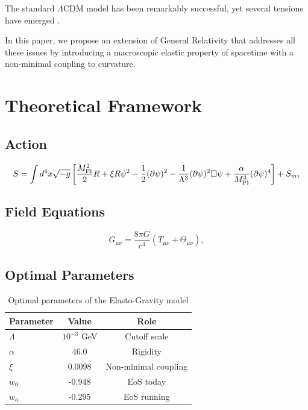 \documentclass[aps,prd,preprint,superscriptaddress]{revtex4-2}
\newcommand{\Mpl}{M_{\rm Pl}}
\newcommand{\Lamb}{\Lambda}
\newcommand{\scal}{\psi}
\newcommand{\Tmu}{\Theta_{\mu\nu}}
\begin{document}
The standard $\Lambda$CDM model has been remarkably successful, yet several tensions have emerged \cite{Planck2018, Riess2019, Hildebrandt2020, DESI2024}.

In this paper, we propose an extension of General Relativity that addresses all these issues by introducing a macroscopic elastic property of spacetime with a non-minimal coupling to curvature.

\section{Theoretical Framework}

\subsection{Action}

\begin{equation}
S = \int d^4x \sqrt{-g} \left[ \frac{\Mpl^2}{2}R + \xi R\scal^2 - \frac{1}{2}(\partial\scal)^2 - \frac{1}{\Lamb^3}(\partial\scal)^2\Box\scal + \frac{\alpha}{\Mpl^4}(\partial\scal)^4 \right] + S_m,
\label{eq:action}
\end{equation}

\subsection{Field Equations}

\begin{equation}
G_{\mu\nu} = \frac{8\pi G}{c^4}\left(T_{\mu\nu} + \Tmu\right),
\label{eq:einstein}
\end{equation}

\subsection{Optimal Parameters}

\begin{table}[h]
\centering
\caption{Optimal parameters of the Elasto-Gravity model}
\begin{tabular}{lcc}
\toprule
Parameter & Value & Role \\
\midrule
$\Lamb$ & $10^{-3}$ GeV & Cutoff scale \\
$\alpha$ & 46.0 & Rigidity \\
$\xi$ & 0.0098 & Non-minimal coupling \\
$w_0$ & -0.948 & EoS today \\
$w_a$ & -0.295 & EoS running \\
\bottomrule
\end{tabular}
\label{tab:params}
\end{table}
\end{document}

